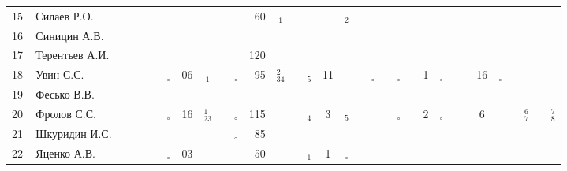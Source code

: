 \documentclass[a4paper,landscape,11pt]{article}
\newcommand*\OK{&\small \ding{51}$\!\!_\circ$} %
\newcommand*\Ok{&\small \ding{51}$\!\!_\circ$} %
\newcommand*\ok{&{\small \ding{51}}} %
\newcommand*\no{&{\small }} %
\newcommand*\da{&{\small\ding{48}$\!\!_1$}} %
\newcommand*\ac{&{\small\ding{48}$\!\!^1_{23}$}} %
\newcommand*\db{&{\small\ding{48}$\!\!_2$}} %
\newcommand*\dd{&{\small\ding{48}$\!\!_4$}} %
\newcommand*\bd{&{\small\ding{48}$\!\!^2_{34}$}} %
\newcommand*\de{&{\small\ding{48}$\!\!_5$}} %
\newcommand*\fg{&{\small\ding{48}$\!\!^6_7$}} %
\newcommand*\gh{&{\small\ding{48}$\!\!^7_8$}} %
\begin{document}
\begin{tabular}{p{7pt}|l|p{6pt}p{6pt}cp{6pt}cccccrcccccccccccccccccccc}
15\,&Силаев Р.О.      \ok\ok\no\no\no\no\no\no\ok& 60\da\ok\no \no\db\no\ok\no\no\no\no\no\no\no\no\no\no\no\no\no\\
16\,&Синицин А.В.     \ok\ok\no\ok\no\no\no\no\no \no\no\no\no \no\no\no\no\no\no\no\no\no\no\no\no\no\no\no\no\no\\
17\,&Терентьев А.И.   \ok\ok\ok\ok\no\no\no\no\ok&120\no\no\no \no\no\no\no\no\no\no\no\no\no\no\no\no\no\no\no\no\\
18\,&Увин С.С.        \ok\ok\ok\ok\OK&06\da\ok\OK& 95\bd\ok\de& 11\ok\ok\Ok\ok\Ok\ok& 1\Ok\ok\ok&16\Ok\ok\ok\ok\ok\\
19\,&Фесько В.В.      \no\no\no\no\no\no\no\no\no \no\no\no\no \no\no\no\no\no\no\no\no\no\no\no\no\no\no\no\no\no\\
20\,&Фролов С.С.      \ok\ok\ok\ok\OK&16\ac\ok\OK&115\ok\ok\dd&  3\de\ok\ok\ok\Ok\no& 2\Ok\ok\ok& 6\ok\ok\fg\ok\gh\\ 
21\,&Шкуридин И.С.    \ok\ok\ok\ok\ok\no\ok\ok\OK& 85\ok\ok\no \no\ok\no\no\no\no\ok\no\no\no\no\no\no\no\no\no\no\\
22\,&Яценко А.В.      \ok\ok\ok\ok\OK&03\ok\ok\ok& 50\ok\ok\da&  1\Ok\no\no\no\no\ok\no\no\no\no\no\no\no\no\no\no\\ 
\bottomrule
\end{tabular} 
\newpage
\end{document}
